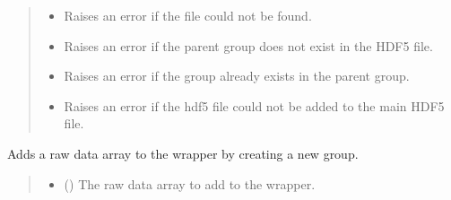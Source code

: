 \documentclass[letterpaper,10pt,english]{sphinxmanual}
\begin{document}
\begin{fulllineitems}
\begin{fulllineitems}
\begin{quote}
\begin{description}
\begin{itemize}
\end{itemize}

\begin{itemize}
\item {} 
\sphinxAtStartPar
{} \textendash{} Raises an error if the file could not be found.

\item {} 
\sphinxAtStartPar
{} \textendash{} Raises an error if the parent group does not exist in the HDF5 file.

\item {} 
\sphinxAtStartPar
{} \textendash{} Raises an error if the group already exists in the parent group.

\item {} 
\sphinxAtStartPar
{\hyperref[\detokenize{_autosummary/HDF5_BLS.WrapperError:HDF5_BLS.WrapperError}]{}} \textendash{} Raises an error if the hdf5 file could not be added to the main HDF5 file.

\end{itemize}

\end{description}\end{quote}

\end{fulllineitems}


\begin{fulllineitems}
\label{\detokenize{_autosummary/HDF5_BLS.wrapper:HDF5_BLS.wrapper.Wrapper.add_raw_data}}
\pysigstartsignatures
\pysiglinewithargsret
{}
{\sphinxparamcomma {}\sphinxparamcomma {}\sphinxparamcomma {}}
{}
\pysigstopsignatures
\sphinxAtStartPar
Adds a raw data array to the wrapper by creating a new group.
\begin{quote}\begin{description}
\begin{itemize}
\item {} 
\sphinxAtStartPar
{} () \textendash{} The raw data array to add to the wrapper.


\end{itemize}
\end{description}
\end{quote}
\end{fulllineitems}
\end{fulllineitems}
\end{document}
